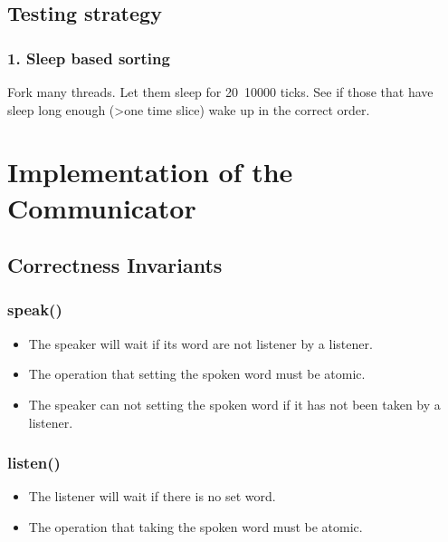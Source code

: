\documentclass{article}
\begin{document}
	\subsection{Testing strategy}
	
	\subsubsection*{1. Sleep based sorting}
	Fork many threads. Let them sleep for 20~10000 ticks. See if those that have sleep long enough (>one time slice) wake up in the correct order.
%	
	\section{Implementation of the Communicator}
	
	\subsection{Correctness Invariants}
	
	\subsubsection*{speak()}
	\begin{itemize}
		\item The speaker will wait if its word are not listener by a listener.
		\item The operation that setting the spoken word must be atomic.
		\item The speaker can not setting the spoken word if it has not been taken by a listener.
	\end{itemize}
	
	\subsubsection*{listen()}
	\begin{itemize}
		\item The listener will wait if there is no set word.
		\item The operation that taking the spoken word must be atomic.
	\end{itemize}
	
\end{document}
